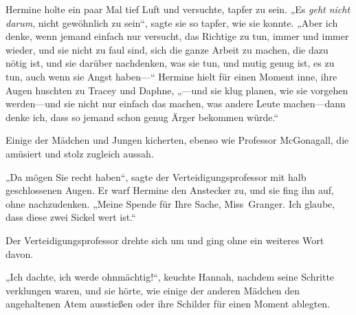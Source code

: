 Hermine holte ein paar Mal tief Luft und versuchte, tapfer zu sein.
„Es \emph{geht nicht darum}, nicht gewöhnlich zu sein“, sagte sie so tapfer, wie sie konnte.
„Aber ich denke, wenn jemand einfach nur versucht, das Richtige zu tun, immer und immer wieder, und sie nicht zu faul sind, sich die ganze Arbeit zu machen, die dazu nötig ist, und sie darüber nachdenken, was sie tun, und mutig genug ist, es zu tun, auch wenn sie Angst haben—“ Hermine hielt für einen Moment inne, ihre Augen huschten zu Tracey und Daphne, „—und sie klug planen, wie sie vorgehen werden—und sie nicht nur einfach das machen, was andere Leute machen—dann denke ich, dass so jemand schon genug Ärger bekommen würde.“

Einige der Mädchen und Jungen kicherten, ebenso wie Professor McGonagall, die amüsiert und stolz zugleich aussah.

„Da mögen Sie recht haben“, sagte der Verteidigungsprofessor mit halb geschlossenen Augen. Er warf Hermine den Anstecker zu, und sie fing ihn auf, ohne nachzudenken.
„Meine Spende für Ihre Sache, Miss~Granger. Ich glaube, dass diese zwei Sickel wert ist.“

Der Verteidigungsprofessor drehte sich um und ging ohne ein weiteres Wort davon.

„Ich dachte, ich werde ohnmächtig!“, keuchte Hannah, nachdem seine Schritte verklungen waren, und sie hörte, wie einige der anderen Mädchen den angehaltenen Atem ausstießen oder ihre Schilder für einen Moment ablegten.

